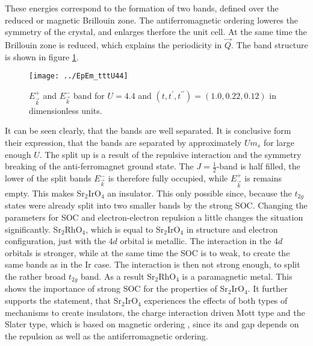 These energies correspond to the formation of two bands, defined over the reduced or magnetic Brillouin zone.
The antiferromagnetic ordering loweres the symmetry of the crystal, and enlarges therfore the unit cell.
At the same time the Brillouin zone is reduced, which explains the periodicity in $\vec Q$. 
The band structure is shown in figure \ref{EpmDisp}. 
\begin{figure}
 \begin{center}
  \texttt{[image: ../EpEm\_tttU44]}
  \caption{$E^+_{\vec k}$ and $E^-_{\vec k}$ band for $U=4.4$ and $(t,t^{\prime},t^{\prime \prime})=(1.0,0.22,0.12)$ in dimensionless units.}
\label{EpmDisp}
  \end{center}
 \end{figure}
%
It can be seen clearly, that the bands are well separated.
It is conclusive form their expression, that the bands are separated by approximately $Um_s$ for large enough $U$.
The split up is a result of the repulsive interaction and the symmetry breaking of the anti-ferromagnet ground state.
The $J=\frac12$-band is half filled, the lower of the split bands $E^-_{\vec k}$ is therefore fully occupied, while 
$E^+_{\vec k}$ is remains empty. 
This makes Sr$_2$IrO$_4$ an insulator.
This only possible since, because the $t_{2g}$ states were already split into two smaller bands by the strong SOC.
Changing the parameters for SOC and electron-electron repulsion a little changes the situation significantly.
Sr$_2$RhO$_4$, which  is equal to Sr$_2$IrO$_4$ in structure and electron configuration,
just with the $4d$ orbital is metallic\cite{PhysRevLett.96.246402}. 
The interaction in the $4d$ orbitals is stronger, while at the same time the SOC is to weak, to create the same bands 
as in the Ir case. The interaction is then not strong enough, to split the rather broad $t_{2g}$ band.
As a result Sr$_2$RhO$_4$ is a paramagnetic metal.
This shows the importance of strong SOC for the properties of Sr$_2$IrO$_4$. 
%
It further supports  the statement, that Sr$_2$IrO$_4$  experiences the effects of both types of mechanisms to create insulators,
the charge interaction driven Mott type and the Slater type, which is based on magnetic ordering \cite{PhysRevB.89.165115},
since its and gap depends on the repulsion as well as the antiferromagnetic ordering.







